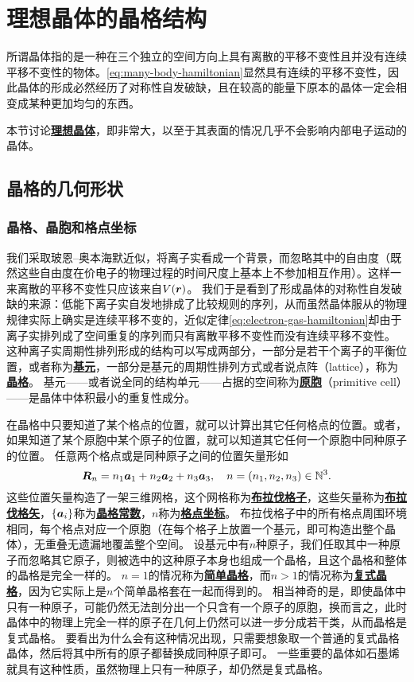 \documentclass[hyperref, UTF8, a4paper]{ctexart}
\newcommand*{\concept}[1]{\underline{\textbf{#1}}}
\begin{document}
\section{理想晶体的晶格结构}

所谓晶体指的是一种在三个独立的空间方向上具有离散的平移不变性且并没有连续平移不变性的物体。\eqref{eq:many-body-hamiltonian}显然具有连续的平移不变性，因此晶体的形成必然经历了对称性自发破缺，且在较高的能量下原本的晶体一定会相变成某种更加均匀的东西。

本节讨论\concept{理想晶体}，即非常大，以至于其表面的情况几乎不会影响内部电子运动的晶体。

\subsection{晶格的几何形状}

\subsubsection{晶格、晶胞和格点坐标}

我们采取玻恩–奥本海默近似，将离子实看成一个背景，而忽略其中的自由度（既然这些自由度在价电子的物理过程的时间尺度上基本上不参加相互作用）。这样一来离散的平移不变性只应该来自$V(\vb*{r})$。
我们于是看到了形成晶体的对称性自发破缺的来源：低能下离子实自发地排成了比较规则的序列，从而虽然晶体服从的物理规律实际上确实是连续平移不变的，近似定律\eqref{eq:electron-gas-hamiltonian}却由于离子实排列成了空间重复的序列而只有离散平移不变性而没有连续平移不变性。
这种离子实周期性排列形成的结构可以写成两部分，一部分是若干个离子的平衡位置，或者称为\concept{基元}，一部分是基元的周期性排列方式或者说点阵（lattice），称为\concept{晶格}。
基元——或者说全同的结构单元——占据的空间称为\concept{原胞}（primitive cell）——是晶体中体积最小的重复性成分。

在晶格中只要知道了某个格点的位置，就可以计算出其它任何格点的位置。或者，如果知道了某个原胞中某个原子的位置，就可以知道其它任何一个原胞中同种原子的位置。
任意两个格点或是同种原子之间的位置矢量形如
\begin{equation}
    \vb*{R}_n = n_1 \vb*{a}_1 + n_2 \vb*{a}_2 + n_3 \vb*{a}_3, \quad n = (n_1, n_2, n_3) \in \mathbb{N}^3.
\end{equation}
这些位置矢量构造了一架三维网格，这个网格称为\concept{布拉伐格子}，这些矢量称为\concept{布拉伐格矢}，$\{\vb*{a}_i\}$称为\concept{晶格常数}，$n$称为\concept{格点坐标}。
布拉伐格子中的所有格点周围环境相同，每个格点对应一个原胞（在每个格子上放置一个基元，即可构造出整个晶体），无重叠无遗漏地覆盖整个空间。
设基元中有$n$种原子，我们任取其中一种原子而忽略其它原子，则被选中的这种原子本身也组成一个晶格，且这个晶格和整体的晶格是完全一样的。
$n=1$的情况称为\concept{简单晶格}，而$n>1$的情况称为\concept{复式晶格}，因为它实际上是$n$个简单晶格套在一起而得到的。
相当神奇的是，即使晶体中只有一种原子，可能仍然无法剖分出一个只含有一个原子的原胞，换而言之，此时晶体中的物理上完全一样的原子在几何上仍然可以进一步分成若干类，从而晶格是复式晶格。
要看出为什么会有这种情况出现，只需要想象取一个普通的复式晶格晶体，然后将其中所有的原子都替换成同种原子即可。
一些重要的晶体如石墨烯就具有这种性质，虽然物理上只有一种原子，却仍然是复式晶格。
\end{document}
